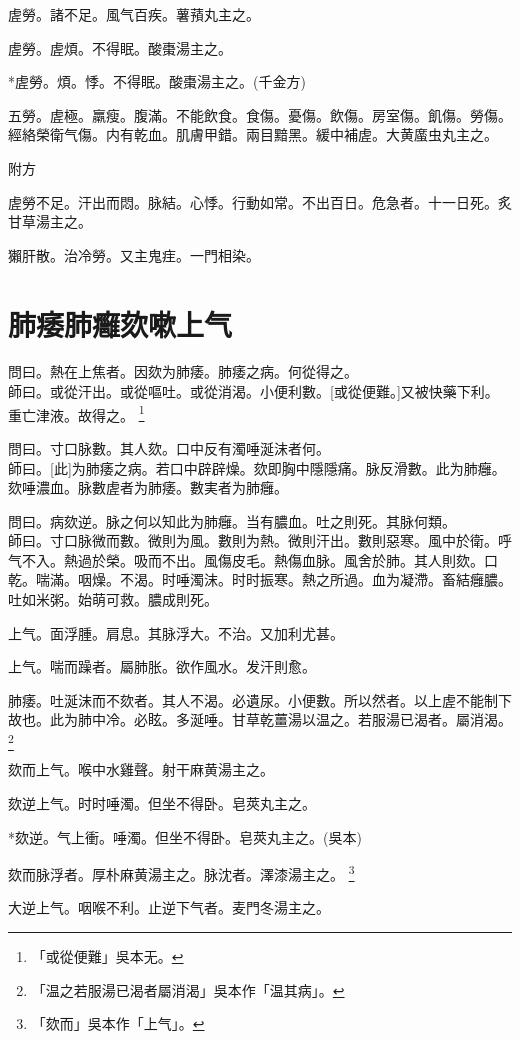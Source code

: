 \documentclass[12pt,twoside,UTF8,b5paper]{ctexbook}
\begin{document}
虗勞。諸不足。風气百疾。薯蕷丸主之。

虗勞。虗煩。不得眠。酸棗湯主之。

*虗勞。煩。悸。不得眠。酸棗湯主之。(千金方)

五勞。虗極。羸瘦。腹滿。不能飲食。食傷。憂傷。飲傷。房室傷。飢傷。勞傷。經絡榮衛气傷。内有乾血。肌膚甲錯。兩目黯黑。緩中補虗。大黄䗪虫丸主之。

附方

虗勞不足。汗出而悶。脉結。心悸。行動如常。不出百日。危急者。十一日死。炙甘草湯主之。

獺肝散。治冷勞。又主鬼疰。一門相染。

\chapter{肺痿肺癰欬嗽上气}

問曰。熱在上焦者。因欬为肺痿。肺痿之病。何從得之。\\
師曰。或從汗出。或從嘔吐。或從消渴。小便利數。[或從便難。]又被快藥下利。重亡津液。故得之。
	\footnote{「或從便難」吳本无。}

問曰。寸口脉數。其人欬。口中反有濁唾涎沫者何。\\
師曰。[此]为肺痿之病。若口中辟辟燥。欬即胸中隱隱痛。脉反滑數。此为肺癰。欬唾濃血。脉數虗者为肺痿。數実者为肺癰。

問曰。病欬逆。脉之何以知此为肺癰。当有膿血。吐之則死。其脉何類。\\
師曰。寸口脉微而數。微則为風。數則为熱。微則汗出。數則惡寒。風中於衛。呼气不入。熱過於榮。吸而不出。風傷皮毛。熱傷血脉。風舍於肺。其人則欬。口乾。喘滿。咽燥。不渴。时唾濁沫。时时振寒。熱之所過。血为凝滯。畜結癰膿。吐如米粥。始萌可救。膿成則死。

上气。面浮腫。肩息。其脉浮大。不治。又加利尤甚。

上气。喘而躁者。屬肺胀。欲作風水。发汗則愈。

肺痿。吐涎沫而不欬者。其人不渴。必遺尿。小便數。所以然者。以上虗不能制下故也。此为肺中冷。必眩。多涎唾。甘草乾薑湯以温之。若服湯已渴者。屬消渴。
	\footnote{「温之若服湯已渴者屬消渴」吳本作「温其病」。}

欬而上气。喉中水雞聲。射干麻黄湯主之。

欬逆上气。时时唾濁。但坐不得卧。皂莢丸主之。

*欬逆。气上衝。唾濁。但坐不得卧。皂莢丸主之。(吳本)

欬而脉浮者。厚朴麻黄湯主之。脉沈者。澤漆湯主之。
	\footnote{「欬而」吳本作「上气」。}

大逆上气。咽喉不利。止逆下气者。麦門冬湯主之。
\end{document}
